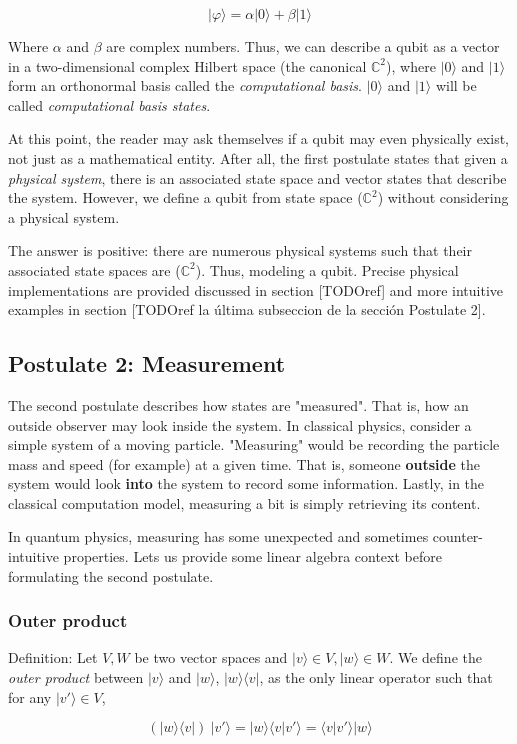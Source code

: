 $$ |\varphi\rangle = \alpha |0\rangle + \beta |1\rangle $$

Where $\alpha$ and $\beta$ are complex numbers. Thus, we can describe a qubit as a vector in a two-dimensional complex Hilbert space (the canonical $\mathds{C}^{2}$), where $|0\rangle$ and $|1\rangle$ form an orthonormal basis called the \emph{computational basis}. $|0\rangle$ and $|1\rangle$ will be called \emph{computational basis states}.

At this point, the reader may ask themselves if a qubit may even physically exist, not just as a mathematical entity. After all, the first postulate states that given a \emph{physical system}, there is an associated state space and vector states that describe the system. However, we define a qubit from state space ($\mathds{C}^{2}$) without considering a physical system. 

The answer is positive: there are numerous physical systems such that their associated state spaces are ($\mathds{C}^{2}$). Thus, modeling a qubit. Precise physical implementations are provided discussed in section [TODOref] and more intuitive examples in section [TODOref la última subseccion de la sección Postulate 2].


\subsection{Postulate 2: Measurement}


The second postulate describes how states are "measured". That is, how an outside observer may look inside the system. In classical physics, consider a simple system of a moving particle. "Measuring" would be recording the particle mass and speed (for example) at a given time. That is, someone \textbf{outside} the system would look \textbf{into} the system to record some information. Lastly, in the classical computation model, measuring a bit is simply retrieving its content.

In quantum physics, measuring has some unexpected and sometimes counter-intuitive properties. Lets us provide some linear algebra context before formulating the second postulate.


\subsubsection{Outer product}


\begin{definition}
	Definition: Let $V, W$ be two vector spaces and $|v\rangle \in V, |w\rangle \in W$. We define the \emph{outer product} between $|v\rangle$ and $|w\rangle$, $|w\rangle\langle v|$, as the only linear operator such that for any $|v'\rangle \in V$, 
	
	$$ (|w\rangle\langle v|) \ |v'\rangle = |w\rangle\langle v|v'\rangle = \langle v|v'\rangle |w\rangle$$
\end{definition}

